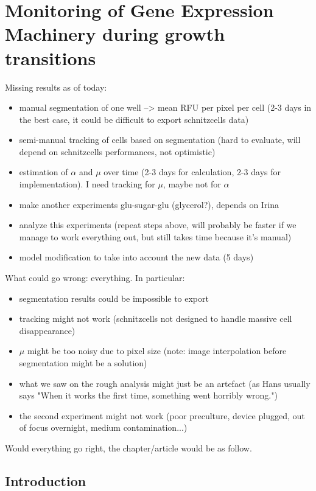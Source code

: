 \chapter{Monitoring of Gene Expression Machinery during growth transitions}

Missing results as of today:
\begin{itemize}
\item manual segmentation of one well --> mean RFU per pixel per cell (2-3 days in the best case, it could be difficult to export schnitzcells data)
\item semi-manual tracking of cells based on segmentation (hard to evaluate, will depend on schnitzcells performances, not optimistic)
\item estimation of $\alpha$ and $\mu$ over time (2-3 days for calculation, 2-3 days for implementation). I need tracking for $\mu$, maybe not for $\alpha$
\item make another experiments glu-sugar-glu (glycerol?), depends on Irina
\item analyze this experiments (repeat steps above, will probably be faster if we manage to work everything out, but still takes time because it's manual)
\item model modification to take into account the new data (5 days)
\end{itemize}

What could go wrong: everything. In particular:
\begin{itemize}
\item segmentation results could be impossible to export
\item tracking might not work (schnitzcells not designed to handle massive cell disappearance)
\item $\mu$ might be too noisy due to pixel size (note: image interpolation before segmentation might be a solution)
\item what we saw on the rough analysis might just be an artefact (as Hans usually says "When it works the first time, something went horribly wrong.")
\item the second experiment might not work (poor preculture, device plugged, out of focus overnight, medium contamination...)
\end{itemize}

Would everything go right, the chapter/article would be as follow.

\section{Introduction}


